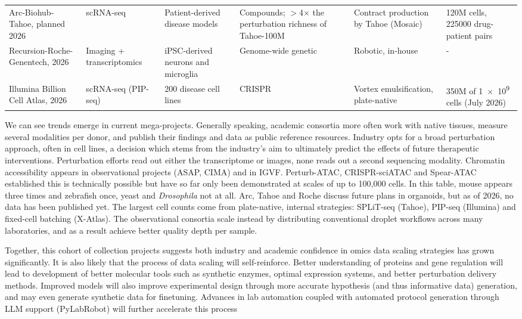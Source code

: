 \begin{xltabular}{\textwidth}{@{}YYYYYY@{}}
Arc-Biohub-Tahoe, planned 2026\supercite{tahoe2026perturbation} & scRNA-seq & Patient-derived disease models & Compounds; $>$4$\times$ the perturbation richness of Tahoe-100M & Contract production by Tahoe (Mosaic) & 120M cells, \num{225000} drug-patient pairs \\
Recursion-Roche-Genentech, 2026\supercite{recursion2026multimodal,recursion2026neuroscience} & Imaging + transcriptomics & iPSC-derived neurons and microglia & Genome-wide genetic & Robotic, in-house & - \\
Illumina Billion Cell Atlas, 2026\supercite{illumina2026billioncell} & scRNA-seq (PIP-seq) & 200 disease cell lines & CRISPR & Vortex emulsification, plate-native & 350M of \num{1e9} cells (July 2026) \\
\end{xltabular}
\endgroup

We can see trends emerge in current mega-projects. Generally speaking, academic consortia more often work with native tissues, measure several modalities per donor, and publish their findings and data as public reference resources. Industry opts for a broad perturbation approach, often in cell lines, a decision which stems from the industry's aim to ultimately predict the effects of future therapeutic interventions. Perturbation efforts read out either the transcriptome or images, none reads out a second sequencing modality. Chromatin accessibility appears in observational projects (ASAP, CIMA) and in IGVF. Perturb-ATAC, CRISPR-sciATAC and Spear-ATAC established this is technically possible but have so far only been demonstrated at scales of up to 100,000 cells. In this table, mouse appears three times and zebrafish once, yeast and \textit{Drosophila} not at all. Arc, Tahoe and Roche discuss future plans in organoids, but as of 2026, no data has been published yet. The largest cell counts come from plate-native, internal strategies: SPLiT-seq (Tahoe), PIP-seq (Illumina) and fixed-cell batching (X-Atlas). The observational consortia scale instead by distributing conventional droplet workflows across many laboratories, and as a result achieve better quality depth per sample.

Together, this cohort of collection projects suggests both industry and academic confidence in omics data scaling strategies has grown significantly. It is also likely that the process of data scaling will self-reinforce. Better understanding of proteins and gene regulation will lead to development of better molecular tools such as synthetic enzymes, optimal expression systems, and better perturbation delivery methods. Improved models will also improve experimental design through more accurate hypothesis (and thus informative data) generation, and may even generate synthetic data for finetuning. Advances in lab automation coupled with automated protocol generation through LLM support (PyLabRobot) will further accelerate this process

